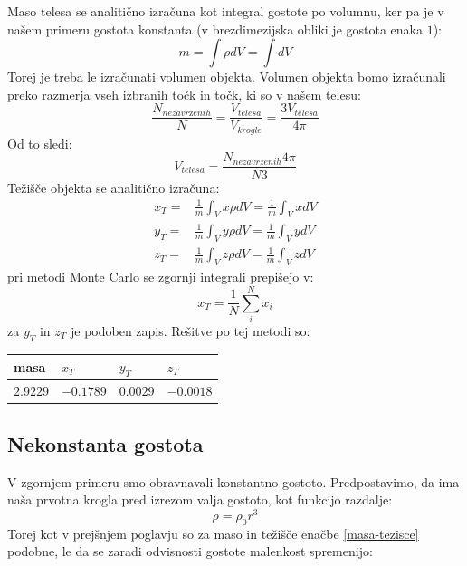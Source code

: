 \documentclass[slovene,11pt,a4paper]{article}
\numberwithin{equation}{section} %
\numberwithin{figure}{section} %
\numberwithin{table}{section} %
\begin{document}
Maso telesa se analitično izračuna kot integral gostote po volumnu, ker pa je v našem primeru gostota konstanta (v brezdimezijska obliki je gostota enaka $1$):
\begin{equation}
m= \int \rho dV = \int dV
\end{equation}
Torej je treba le izračunati volumen objekta. Volumen objekta bomo izračunali preko razmerja vseh izbranih točk in točk, ki so v našem telesu:
\begin{equation}
\frac{N_{nezavrženih}}{N}=\frac{V_{telesa}}{V_{krogle}}=\frac{3 V_{telesa}}{4 \pi}
\end{equation}
Od to sledi:
\begin{equation}
V_{telesa}=\frac{N_{nezavrzenih }4 \pi}{ N 3}
\end{equation}
Težišče objekta se analitično izračuna:
\begin{equation}
\label{masa-tezisce}
\begin{aligned}
x_T=& \frac{1}{m}\int_V x \rho dV = \frac{1}{m}\int_V x dV \\
y_T =& \frac{1}{m}\int_V y \rho dV =\frac{1}{m}\int_V y dV \\
z_T =& \frac{1}{m}\int_V z \rho dV =\frac{1}{m}\int_V z dV
\end{aligned}
\end{equation}
pri metodi Monte Carlo se zgornji integrali prepišejo v:
\begin{equation}
x_T=\frac{1}{N} \sum_i^N x_i 
\end{equation}
za $y_T$ in $z_T$ je podoben zapis.
Rešitve po tej metodi so:
\begin{table}[h]
\begin{center}
\begin{tabular}{|l|l|l|l|}
\hline
masa & $x_T$ & $y_T$ & $z_T$ \\ \hline
$2.9229$ & $-0.1789$ & $0.0029$ & $-0.0018$ \\ \hline

\end{tabular}
\end{center}
\end{table}


\subsection{Nekonstanta gostota}
V zgornjem primeru smo obravnavali konstantno gostoto. Predpostavimo, da ima naša prvotna krogla pred izrezom valja gostoto, kot funkcijo razdalje:
\begin{equation}
\rho = \rho_0 r^3
\end{equation}
Torej kot v prejšnjem poglavju so za maso in težišče enačbe \ref{masa-tezisce} podobne, le da se zaradi odvisnosti gostote malenkost spremenijo:
\end{document}
